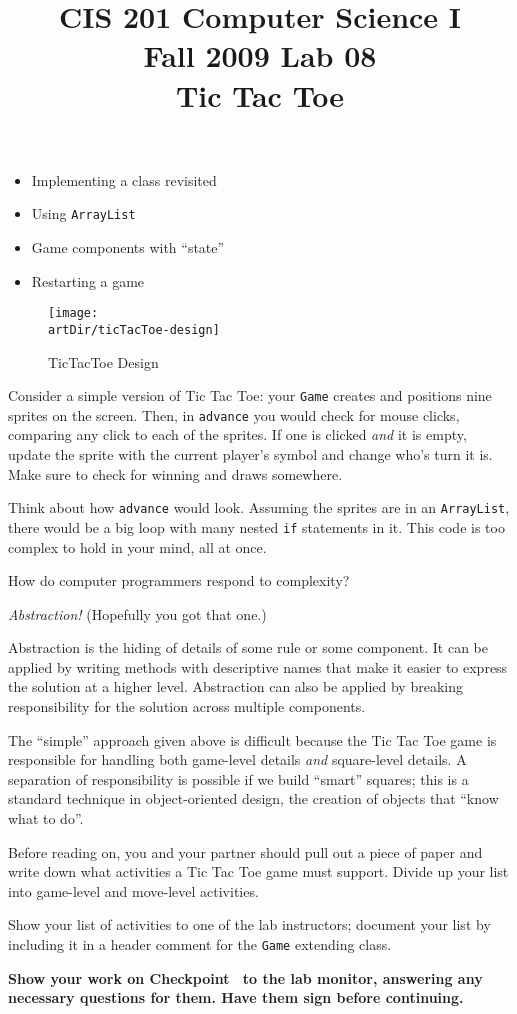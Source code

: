 \documentclass[12pt,oneside]{memoir}
\title{CIS 201 Computer Science I\\Fall 2009 Lab #1\\#2}%
\newcommand\code[1]{\lstinline^#1^}
\newenvironment{Checkpoint}[1]{%
  \begin{Exercise}[name={Checkpoint},title={#1}]}{%
  \end{Exercise}%
  \textbf{Show your work on Checkpoint~\theExercise{} to the lab monitor, %
    answering any necessary questions for them.  Have them sign before continuing.}}
\newcommand{\artDir}{../art}
\newcommand{\lab}[2]{%
  \title{CIS 201 Computer Science I\\Fall 2009 Lab #1\\#2}%
  \maketitle%
}
\begin{document}
\lab{08}{Tic Tac Toe}

\begin{itemize}
\item Implementing a class revisited
\item Using \code{ArrayList}
\item Game components with ``state''
\item Restarting a game
\end{itemize}

\begin{figure}[htb]
  \begin{center}    
    \texttt{[image: \\artDir/ticTacToe-design]}  
    \caption{TicTacToe Design}
    \label{fig:design}
  \end{center}
\end{figure}

\begin{Checkpoint}{Getting Started}

  Consider a simple version of Tic Tac Toe: your \code{Game} creates
  and positions nine sprites on the screen. Then, in \code{advance}
  you would check for mouse clicks, comparing any click to each of the
  sprites. If one is clicked \emph{and} it is empty, update the sprite
  with the current player's symbol and change who's turn it is. Make
  sure to check for winning and draws somewhere.

  Think about how \code{advance} would look. Assuming the sprites are
  in an \code{ArrayList}, there would be a big loop with many nested
  \code{if} statements in it. This code is too complex to hold in your
  mind, all at once.

  How do computer programmers respond to complexity?

  \emph{Abstraction!} (Hopefully you got that one.)

  Abstraction is the hiding of details of some rule or some
  component. It can be applied by writing methods with descriptive
  names that make it easier to express the solution at a higher
  level. Abstraction can also be applied by breaking responsibility
  for the solution across multiple components. 

  The ``simple'' approach given above is difficult because the Tic Tac
  Toe game is responsible for handling both game-level details
  \emph{and} square-level details. A separation of responsibility is
  possible if we build ``smart'' squares; this is a standard technique
  in object-oriented design, the creation of objects that ``know what
  to do''.

  Before reading on, you and your partner should pull out a piece of
  paper and write down what activities a Tic Tac Toe game must
  support. Divide up your list into game-level and move-level
  activities.

  Show your list of activities to one of the lab instructors; document
  your list by including it in a header comment for the \code{Game}
  extending class.
\end{Checkpoint}
\end{document}
